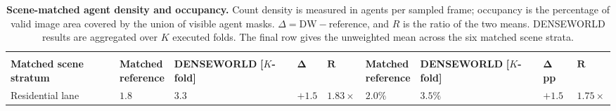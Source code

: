 \begin{table}[ht!]
\centering
\caption{
\textbf{Scene-matched agent density and occupancy.}
Count density is measured in agents per sampled frame; occupancy is the
percentage of valid image area covered by the union of visible agent
masks. \(\Delta=\mathrm{DW}-\mathrm{reference}\), and \(R\) is the
ratio of the two means. DENSEWORLD results are aggregated over
\(K\) executed folds. The final row gives the unweighted mean across
the six matched scene strata.
}
\label{tab:scene_stratified_density_occupancy}

\scriptsize
\setlength{\tabcolsep}{3.8pt}
\renewcommand{\arraystretch}{1.20}

\begin{tabular}{
    >{\raggedright\arraybackslash}p{}
    >{\centering\arraybackslash}p{}
    >{\centering\arraybackslash}p{}
    >{\centering\arraybackslash}p{}
    >{\centering\arraybackslash}p{}
    >{\centering\arraybackslash}p{}
    >{\centering\arraybackslash}p{}
    >{\centering\arraybackslash}p{}
    >{\centering\arraybackslash}p{}
}
\toprule

\rowcolor{PanelBlue}
&
\multicolumn{4}{c}{
\textbf{Agent count density}
\quad\emph{(agents/frame)}
}
&
\multicolumn{4}{c}{
\textbf{Agent occupancy}
\quad\emph{(\% valid area)}
}
\\

\cmidrule(lr){2-5}
\cmidrule(lr){6-9}

\rowcolor{PanelBlue}
\textbf{Matched scene stratum}
&
\shortstack{\textbf{Matched}\\\textbf{reference}}
&
\shortstack{\textbf{DENSEWORLD}\\\textbf{[\(K\)-fold]}}
&
\(\boldsymbol{\Delta}\)
&
\(\boldsymbol{R}\)
&
\shortstack{\textbf{Matched}\\\textbf{reference}}
&
\shortstack{\textbf{DENSEWORLD}\\\textbf{[\(K\)-fold]}}
&
\shortstack{\(\boldsymbol{\Delta}\)\\\textbf{pp}}
&
\(\boldsymbol{R}\)
\\
\midrule

Residential lane
&
\cellcolor{RefGray}\(1.8\)
&
\cellcolor{DWBlue}\(\mathbf{3.3}\)
&
\(+1.5\)
&
\(1.83{\times}\)
&
\cellcolor{RefGray}\(2.0\%\)
&
\cellcolor{DWBlue}\(\mathbf{3.5\%}\)
&
\(+1.5\)
&
\(1.75{\times}\)
\\


\end{tabular}
\end{table}
